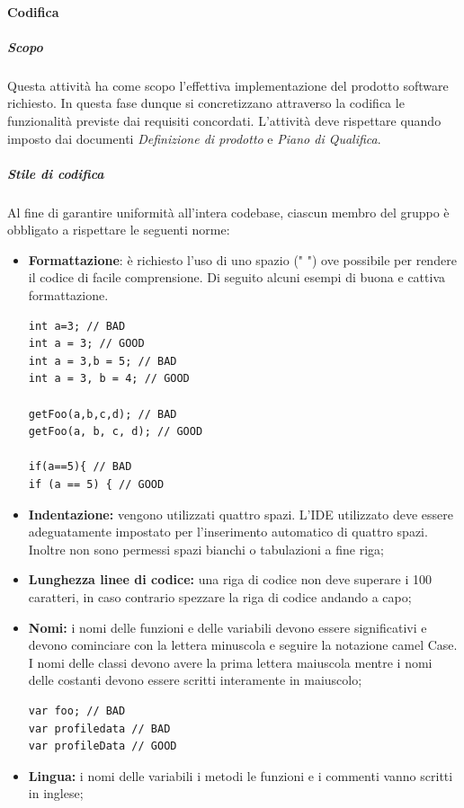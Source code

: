 		\paragraph{Codifica}
			\subparagraph{Scopo} \Spazio
			Questa attività ha come scopo l'effettiva implementazione del prodotto software richiesto. In questa fase dunque si concretizzano attraverso la codifica le funzionalità previste dai requisiti concordati.
			L'attività deve rispettare quando imposto dai documenti \textit{Definizione di prodotto} e \textit{Piano di Qualifica}.
			\subparagraph{Stile di codifica} \Spazio
			Al fine di garantire uniformità all'intera codebase, ciascun membro del gruppo è obbligato a rispettare le seguenti norme:
			\begin{itemize}
			\item \textbf{Formattazione}: è richiesto l'uso di uno spazio (" ") ove possibile per rendere il codice di facile comprensione.
			Di seguito alcuni  esempi di buona e cattiva formattazione.
\begin{lstlisting}
int a=3; // BAD
int a = 3; // GOOD
int a = 3,b = 5; // BAD
int a = 3, b = 4; // GOOD

getFoo(a,b,c,d); // BAD
getFoo(a, b, c, d); // GOOD

if(a==5){ // BAD
if (a == 5) { // GOOD
\end{lstlisting}
			
			\item \textbf{Indentazione:} vengono utilizzati quattro spazi. L'IDE utilizzato deve essere adeguatamente impostato per l'inserimento automatico di quattro spazi. Inoltre non sono permessi spazi bianchi o tabulazioni a fine riga;
			
			\item \textbf{Lunghezza linee di codice:} una riga di codice non deve superare i 100 caratteri, in caso contrario spezzare la riga di codice andando a capo;
			
			\item \textbf{Nomi:} i nomi delle funzioni e delle variabili devono essere significativi e devono cominciare con la lettera minuscola e seguire la notazione camel Case. I nomi delle classi devono avere la prima lettera maiuscola mentre i nomi delle costanti devono essere scritti interamente in maiuscolo;
\begin{lstlisting}
var foo; // BAD
var profiledata // BAD
var profileData // GOOD
\end{lstlisting}
			
			\item \textbf{Lingua:} i nomi delle variabili i metodi le funzioni e i commenti vanno scritti in inglese;
			

\end{itemize}
